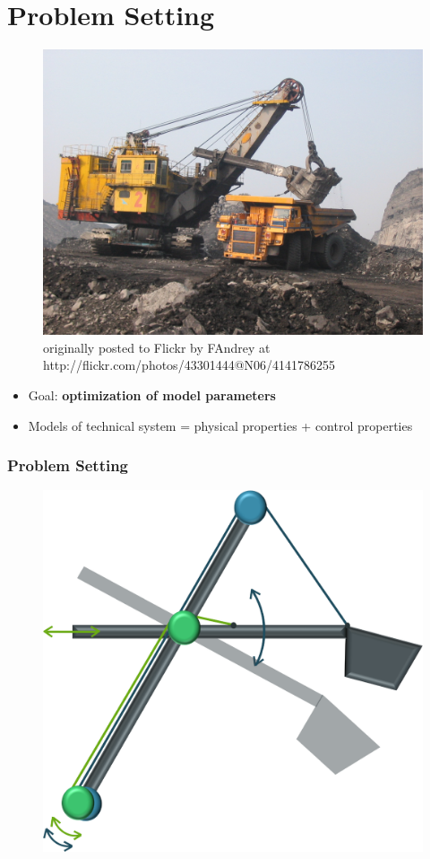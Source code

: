 \section{Problem Setting}

\begin{frame}
	\begin{figure}[t]
		\centering
		\includegraphics[width=.6\linewidth]{img/Excavator} \\
		\tiny{originally posted to Flickr by FAndrey at http://flickr.com/photos/43301444@N06/4141786255}
	\end{figure}

	\begin{itemize}
		\item{Goal: \textbf{optimization of model parameters}}
		\item{Models of technical system = physical properties + control properties}
	\end{itemize}
\end{frame}

\begin{frame}
	\frametitle{Problem Setting}
	\begin{figure}[bth]
		\centering
		\includegraphics[width=.5\linewidth]{img/Problem_1}
	\end{figure}
\end{frame}


